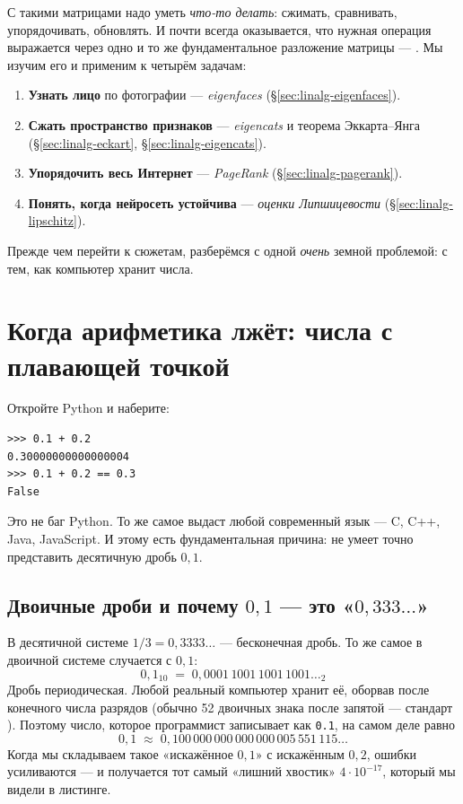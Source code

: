 С такими матрицами надо уметь \emph{что-то делать}: сжимать,
сравнивать, упорядочивать, обновлять. И почти всегда оказывается,
что нужная операция выражается через одно и то же фундаментальное
разложение матрицы — . Мы изучим его и применим
к четырём задачам:

\begin{enumerate}\itemsep1pt
  \item \textbf{Узнать лицо} по фотографии — \emph{eigenfaces}
        (§\ref{sec:linalg-eigenfaces}).
  \item \textbf{Сжать пространство признаков} — \emph{eigencats} и
        теорема Эккарта–Янга (§\ref{sec:linalg-eckart},
        §\ref{sec:linalg-eigencats}).
  \item \textbf{Упорядочить весь Интернет} — \emph{PageRank}
        (§\ref{sec:linalg-pagerank}).
  \item \textbf{Понять, когда нейросеть устойчива} — \emph{оценки
        Липшицевости} (§\ref{sec:linalg-lipschitz}).
\end{enumerate}

Прежде чем перейти к сюжетам, разберёмся с одной \emph{очень} земной
проблемой: с тем, как компьютер хранит числа.

\section{Когда арифметика лжёт: числа с плавающей точкой}
\label{sec:linalg-floats}

Откройте Python и наберите:
\begin{lstlisting}[label={lst:float-paradox}]
>>> 0.1 + 0.2
0.30000000000000004
>>> 0.1 + 0.2 == 0.3
False
\end{lstlisting}

Это не баг Python. То же самое выдаст любой современный язык —
C, C++, Java, JavaScript. И этому есть фундаментальная причина:
 не умеет точно представить
десятичную дробь $0{,}1$.

\subsection{Двоичные дроби и почему $0{,}1$ — это «$0{,}333\ldots$»}

В десятичной системе $1/3 = 0{,}3333\ldots$ — бесконечная дробь.
То же самое в двоичной системе случается с $0{,}1$:
\[
0{,}1_{10} \;=\; 0{,}0001\,1001\,1001\,1001\ldots_{2}
\]
Дробь периодическая. Любой реальный компьютер хранит её, оборвав
после конечного числа разрядов (обычно 52 двоичных знака после
запятой — стандарт ). Поэтому
число, которое программист записывает как \texttt{0.1}, на самом
деле равно
\[
0{,}1\;\approx\;0{,}100\,000\,000\,000\,000\,005\,551\,115\ldots
\]
Когда мы складываем такое «искажённое $0{,}1$» с искажённым $0{,}2$,
ошибки усиливаются — и получается тот самый «лишний хвостик»
$4\cdot 10^{-17}$, который мы видели в листинге.

